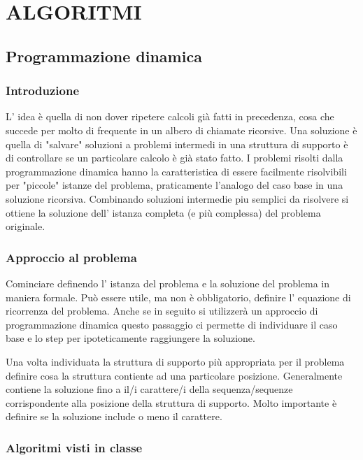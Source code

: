 \documentclass[11pt]{article}
\author{Aurelio}
\date{\today}
\title{}
\begin{document}
\tableofcontents

\section{ALGORITMI}
\label{sec:org35921fc}

\subsection{Programmazione dinamica}
\label{sec:orgdb30e7d}

\subsubsection{Introduzione}
\label{sec:orgcecd278}

L' idea è quella di non dover ripetere calcoli già fatti in precedenza, cosa che succede per 
molto di frequente in un albero di chiamate ricorsive.
Una soluzione è quella di "salvare" soluzioni a problemi intermedi in una struttura di supporto
è di controllare se un particolare calcolo è già stato fatto.
I problemi risolti dalla programmazione dinamica hanno la caratteristica di essere facilmente
risolvibili per "piccole" istanze del problema, praticamente l'analogo del caso base in una soluzione ricorsiva.
Combinando soluzioni intermedie piu semplici da risolvere si ottiene la soluzione dell' istanza completa (e più complessa)
del problema originale.

\subsubsection{Approccio al problema}
\label{sec:orgb81fc97}

Cominciare definendo l' istanza del problema e la soluzione del problema in maniera formale.
Può essere utile, ma non è obbligatorio, definire l' equazione di ricorrenza del problema.
Anche se in seguito si utilizzerà un approccio di programmazione dinamica questo passaggio ci permette di 
individuare il caso base e lo step per ipoteticamente raggiungere la soluzione.

Una volta individuata la struttura di supporto più appropriata per il problema definire cosa
la struttura contiente ad una particolare posizione.
Generalmente contiene la soluzione fino a il/i carattere/i della sequenza/sequenze corrispondente alla
posizione della struttura di supporto. Molto importante è definire se la soluzione include o meno il carattere.

\subsubsection{Algoritmi visti in classe}
\label{sec:orgadd01b4}
\end{document}
